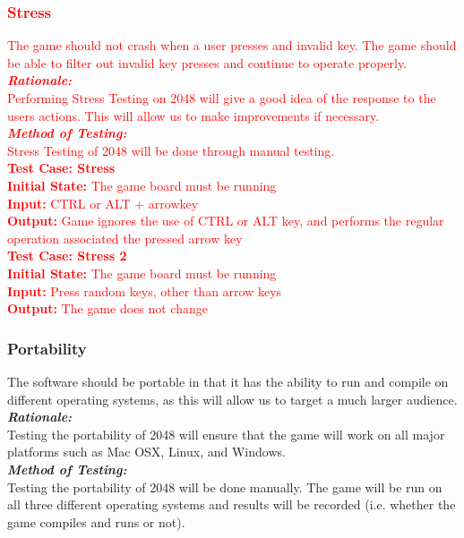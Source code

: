 \documentclass[12pt]{article}
\begin{document}
\subsubsection{\textcolor{red}{Stress}}
\textcolor{red}{The game should not crash when a user presses and invalid key.  The game should be able to filter out invalid key presses and continue to operate properly. \\
\textbf{\emph{Rationale:}}\\
Performing Stress Testing on 2048 will give a good idea of the response to the users actions. This will allow us to make improvements if necessary. \\
\textbf{\emph{Method of Testing:}}\\
Stress Testing of 2048 will be done through manual testing.\\
\textbf{Test Case: Stress}\\
\textbf{Initial State:} The game board must be running\\
\textbf{Input:} CTRL or ALT + arrowkey\\
\textbf{Output:} Game ignores the use of CTRL or ALT key, and performs the regular operation associated the pressed arrow key\\
\textbf{Test Case: Stress 2}\\
\textbf{Initial State:} The game board must be running\\
\textbf{Input:} Press random keys, other than arrow keys\\
\textbf{Output:} The game does not change\\}

\subsubsection{Portability}
The software should be portable in that it has the ability to run and compile on different operating systems, as this will allow us to target a much larger audience. \\

\textbf{\emph{Rationale:}}\\
Testing the portability of 2048 will ensure that the game will work on all major platforms such as Mac OSX, Linux, and Windows. \\

\textbf{\emph{Method of Testing:}}\\
Testing the portability of 2048 will be done manually. The game will be run on all three different operating systems and results will be recorded (i.e. whether the game compiles and runs or not).
\end{document}

